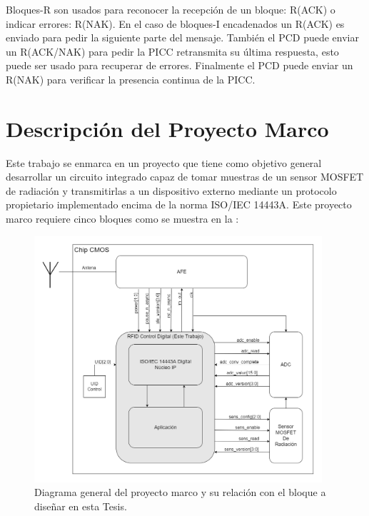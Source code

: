 \documentclass[a4paper, twoside, 11pt]{report}
\begin{document}
Bloques-R son usados para reconocer la recepción de un bloque: R(ACK) o indicar errores: R(NAK). En el caso de bloques-I encadenados un R(ACK) es enviado para pedir la siguiente parte del mensaje. También el PCD puede enviar un R(ACK/NAK) para pedir la PICC retransmita su última respuesta, esto puede ser usado para recuperar de errores. Finalmente el PCD puede enviar un R(NAK) para verificar la presencia continua de la PICC.


\FloatBarrier
\chapter{Descripción del Proyecto Marco}

Este trabajo se enmarca en un proyecto que tiene como objetivo general desarrollar un circuito integrado capaz de tomar muestras de un sensor MOSFET de radiación y transmitirlas a un dispositivo externo mediante un protocolo propietario implementado encima de la norma ISO/IEC 14443A. Este proyecto marco requiere cinco bloques como se muestra en la :

\begin{figure}[htb]
  \centering
  \includegraphics[width=0.95\textwidth]{./img/entire_project_v2}
  \caption{Diagrama general del proyecto marco y su relación con el bloque a diseñar en esta Tesis.}
  \label{fig:entire_project}
\end{figure}
\end{document}
